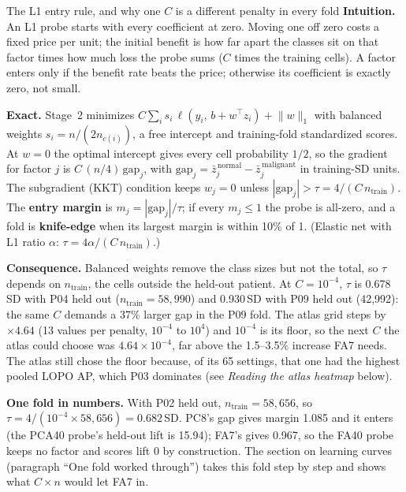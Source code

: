 \begin{explainbox}{The L1 entry rule, and why one $C$ is a different penalty in every fold}
\textbf{Intuition.} An L1 probe starts with every coefficient at zero. Moving one off zero costs a fixed price per unit; the initial benefit is how far apart the classes sit on that factor times how much loss the probe sums ($C$ times the training cells). A factor enters only if the benefit rate beats the price; otherwise its coefficient is exactly zero, not small.

\textbf{Exact.} Stage~2 minimizes $C\sum_{i} s_i\,\ell(y_i,\, b + w^{\top} z_i) + \lVert w\rVert_1$ with balanced weights $s_i = n/(2n_{c(i)})$, a free intercept and training-fold standardized scores. At $w = 0$ the optimal intercept gives every cell probability $1/2$, so the gradient for factor $j$ is $C\,(n/4)\,\mathrm{gap}_j$, with $\mathrm{gap}_j = \bar z_j^{\,\mathrm{normal}} - \bar z_j^{\,\mathrm{malignant}}$ in training-SD units. The subgradient (KKT) condition keeps $w_j = 0$ unless $|\mathrm{gap}_j| > \tau = 4/(C\,n_{\mathrm{train}})$. The \textbf{entry margin} is $m_j = |\mathrm{gap}_j|/\tau$; if every $m_j \leq 1$ the probe is all-zero, and a fold is \textbf{knife-edge} when its largest margin is within 10\% of 1. (Elastic net with L1 ratio $\alpha$: $\tau = 4\alpha/(C\,n_{\mathrm{train}})$.)

\textbf{Consequence.} Balanced weights remove the class sizes but not the total, so $\tau$ depends on $n_{\mathrm{train}}$, the cells outside the held-out patient. At $C = 10^{-4}$, $\tau$ is 0.678\,SD with P04 held out ($n_{\mathrm{train}} = 58{,}990$) and 0.930\,SD with P09 held out (42,992): the same $C$ demands a 37\% larger gap in the P09 fold. The atlas grid steps by $\times 4.64$ (13 values per penalty, $10^{-4}$ to $10^{4}$) and $10^{-4}$ is its floor, so the next $C$ the atlas could choose was $4.64\times10^{-4}$, far above the 1.5--3.5\% increase FA7 needs. The atlas still chose the floor because, of its 65 settings, that one had the highest pooled LOPO AP, which P03 dominates (see \emph{Reading the atlas heatmap} below).

\textbf{One fold in numbers.} With P02 held out, $n_{\mathrm{train}} = 58{,}656$, so $\tau = 4/(10^{-4} \times 58{,}656) = 0.682$\,SD. PC8's gap gives margin 1.085 and it enters (the PCA40 probe's held-out lift is 15.94\pp); FA7's gives 0.967, so the FA40 probe keeps no factor and scores lift 0 by construction. The section on learning curves (paragraph ``One fold worked through'') takes this fold step by step and shows what $C \times n$ would let FA7 in.
\end{explainbox}

